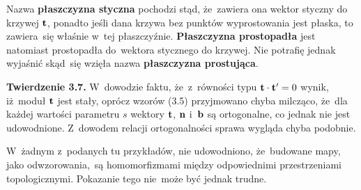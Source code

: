 \documentclass[a4paper,11pt]{article}
\begin{document}




\start {} Nazwa \textbf{płaszczyzna styczna} pochodzi stąd,
że~zawiera ona wektor styczny do krzywej $\mathbf{t}$, ponadto jeśli dana
krzywa bez punktów wyprostowania jest płaska, to zawiera~się właśnie
w~tej płaszczyźnie. \textbf{Płaszczyzna prostopadła} jest natomiast
prostopadła do~wektora stycznego do krzywej. Nie potrafię jednak
wyjaśnić skąd~się wzięła nazwa \textbf{płaszczyzna prostująca}.

\vspace{\spaceFour}



\start {} \textbf{Twierdzenie 3.7.} W~dowodzie faktu, że~z~równości
typu $\mathbf{t} \cdot \mathbf{t}' = 0$ wynik, iż~moduł $\mathbf{t}$ jest stały,
oprócz wzorów (3.5) przyjmowano chyba milcząco, że~dla każdej wartości
parametru $s$ wektory $\mathbf{t}$, $\mathbf{n}$ i~$\mathbf{b}$ są ortogonalne,
co jednak nie jest udowodnione. Z~dowodem relacji ortogonalności sprawa
wygląda chyba podobnie. \Dok

\vspace{\spaceFour}



\start {} W~żadnym z~podanych tu przykładów, nie udowodniono,
że~budowane mapy, jako odwzorowania,~są homomorfizmami między
odpowiednimi przestrzeniami topologicznymi. Pokazanie tego nie~może
być jednak trudne. \Dok

\vspace{\spaceFour}





\end{document}

